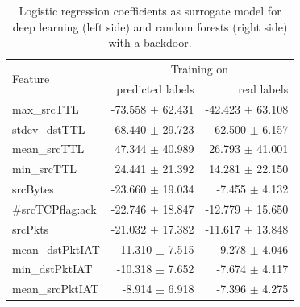 \documentclass[10pt,sigconf,letterpaper]{acmart}
\begin{document}
\begin{table}
 \caption{Logistic regression coefficients as surrogate model for deep learning (left side) and random forests (right side) with a backdoor.} \label{tab:logreg_coeff_bd}
\begin{tabular}{l r r} \toprule 
\multirow{2}{*}{Feature} & \multicolumn{2}{c}{Training on} \\
  & predicted labels & real labels \\ \midrule
         max\_srcTTL &  -73.558 $\pm$ 62.431 &  -42.423 $\pm$ 63.108 \\
       stdev\_dstTTL &  -68.440 $\pm$ 29.723 &  -62.500 $\pm$ 6.157 \\
        mean\_srcTTL &   47.344 $\pm$ 40.989 &   26.793 $\pm$ 41.001 \\
         min\_srcTTL &   24.441 $\pm$ 21.392 &   14.281 $\pm$ 22.150 \\
            srcBytes &  -23.660 $\pm$ 19.034 &   -7.455 $\pm$ 4.132 \\
    \#srcTCPflag:ack &  -22.746 $\pm$ 18.847 &  -12.779 $\pm$ 15.650 \\
             srcPkts &  -21.032 $\pm$ 17.382 &  -11.617 $\pm$ 13.848 \\
     mean\_dstPktIAT &   11.310 $\pm$ 7.515 &    9.278 $\pm$ 4.046 \\
      min\_dstPktIAT &  -10.318 $\pm$ 7.652 &   -7.674 $\pm$ 4.117 \\
     mean\_srcPktIAT &   -8.914 $\pm$ 6.918 &   -7.396 $\pm$ 4.275 \\

\end{tabular}
\end{table}
\end{document}
